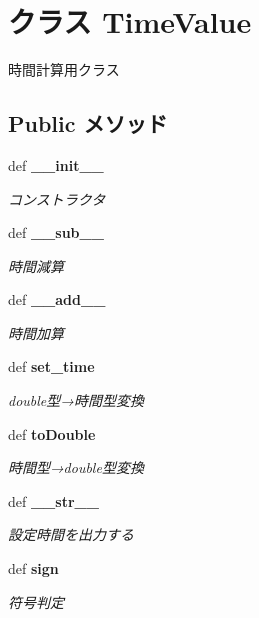 \section{クラス TimeValue}
\label{classsource__py_1_1_time_value_1_1_time_value}
時間計算用クラス  


\subsection*{Public メソッド}
\begin{CompactItemize}
\item 
def {\bf \_\-\_\-init\_\-\_\-}
\begin{CompactList}\small\item\em コンストラクタ \item\end{CompactList}\item 
def {\bf \_\-\_\-sub\_\-\_\-}
\begin{CompactList}\small\item\em 時間減算 \item\end{CompactList}\item 
def {\bf \_\-\_\-add\_\-\_\-}
\begin{CompactList}\small\item\em 時間加算 \item\end{CompactList}\item 
def {\bf set\_\-time}
\begin{CompactList}\small\item\em double型→時間型変換 \item\end{CompactList}\item 
def {\bf toDouble}
\begin{CompactList}\small\item\em 時間型→double型変換 \item\end{CompactList}\item 
def {\bf \_\-\_\-str\_\-\_\-}
\begin{CompactList}\small\item\em 設定時間を出力する \item\end{CompactList}\item 
def {\bf sign}
\begin{CompactList}\small\item\em 符号判定 \item\end{CompactList}\end{CompactItemize}


